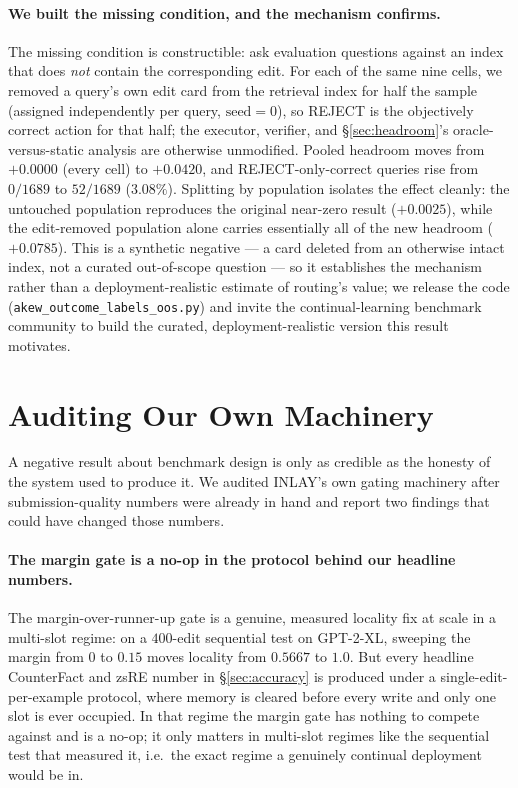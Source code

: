 \documentclass{article}
\begin{document}
\paragraph{We built the missing condition, and the mechanism confirms.}
The missing condition is constructible: ask evaluation questions against an
index that does \emph{not} contain the corresponding edit. For each of the
same nine cells, we removed a query's own edit card from the retrieval
index for half the sample (assigned independently per query,
$\text{seed}=0$), so REJECT is the objectively correct action for that
half; the executor, verifier, and \S\ref{sec:headroom}'s oracle-versus-static
analysis are otherwise unmodified. Pooled headroom moves from $+0.0000$
(every cell) to $\mathbf{+0.0420}$, and REJECT-only-correct queries rise
from $0/1689$ to $52/1689$ ($3.08\%$). Splitting by population isolates the
effect cleanly: the untouched population reproduces the original near-zero
result ($+0.0025$), while the edit-removed population alone carries
essentially all of the new headroom ($+0.0785$). This is a synthetic
negative --- a card deleted from an otherwise intact index, not a curated
out-of-scope question --- so it establishes the mechanism rather than a
deployment-realistic estimate of routing's value; we release the code
(\texttt{akew\_outcome\_labels\_oos.py}) and invite the continual-learning
benchmark community to build the curated, deployment-realistic version this
result motivates.

\section{Auditing Our Own Machinery}
\label{sec:audit}

A negative result about benchmark design is only as credible as the honesty
of the system used to produce it. We audited INLAY's own gating machinery
after submission-quality numbers were already in hand and report two
findings that could have changed those numbers.

\paragraph{The margin gate is a no-op in the protocol behind our headline
numbers.} The margin-over-runner-up gate is a genuine, measured locality fix
at scale in a multi-slot regime: on a $400$-edit sequential test on
GPT-2-XL, sweeping the margin from $0$ to $0.15$ moves locality from
$0.5667$ to $1.0$. But every headline CounterFact and zsRE number in
\S\ref{sec:accuracy} is produced under a single-edit-per-example protocol,
where memory is cleared before every write and only one slot is ever
occupied. In that regime the margin gate has nothing to compete against and
is a no-op; it only matters in multi-slot regimes like the sequential test
that measured it, i.e.\ the exact regime a genuinely continual deployment
would be in.
\end{document}
